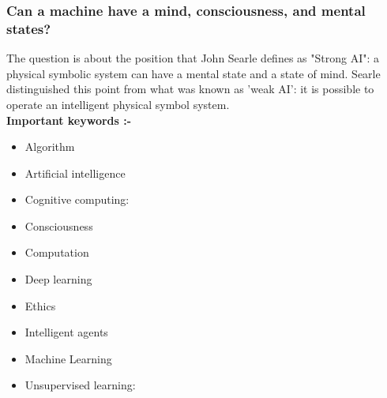 \documentclass[12pt,a4paper]{article}
\begin{document}
\subsubsection* {Can a machine have a mind, consciousness, and mental states?}
The question is about the position that John Searle defines as "Strong AI": a physical symbolic system can have a mental state and a state of mind.
Searle distinguished this point from what was known as 'weak AI': it is possible to operate an intelligent physical symbol system.
\\

\textbf{Important keywords :- }
\begin{itemize}[itemsep=10pt]
\item Algorithm
\item Artificial intelligence
\item Cognitive computing:
\item Consciousness
\item Computation
\item Deep learning
\item Ethics
\item Intelligent agents
\item Machine Learning
\item Unsupervised learning: 
\end{itemize}
\end{document}
